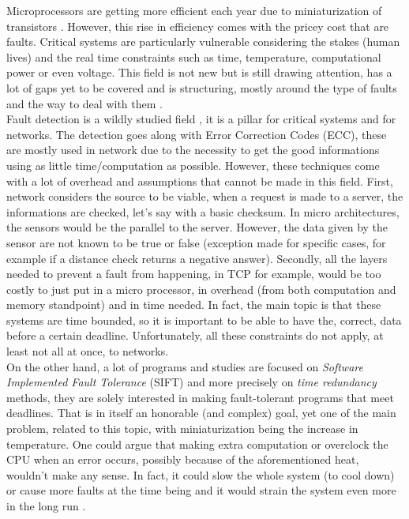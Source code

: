 \documentclass[11pt,a4paper]{report}
\begin{document}
Microprocessors are getting more efficient each year due to miniaturization of transistors \cite{silicon}. 
However, this rise in efficiency comes with the pricey cost that are faults. 
Critical systems are particularly vulnerable considering the stakes (human lives) and the real time constraints such as time, temperature, computational power or even voltage. 
This field is not new \cite{vonneumann56, n-version85} but is still drawing attention, has a lot of gaps yet to be covered and is structuring, mostly around the type of faults and the way to deal with them \cite{future-research}.
\\

Fault detection is a wildly studied field \cite{fault-detection-survey}, it is a pillar for critical systems and for networks. 
The detection goes along with Error Correction Codes (ECC), these are mostly used in network due to the necessity to get the good informations using as little  time/computation as possible. 
However, these techniques come with a lot of overhead and assumptions that cannot be made in this field. 
First, network considers the source to be viable, when a request is made to a server, the informations are checked, let's say with a basic checksum. 
In micro architectures, the sensors would be the parallel to the server. 
However, the data given by the sensor are not known to be true or false (exception made for specific cases, for example if a distance check returns a negative answer). 
Secondly, all the layers needed to prevent a fault from happening, in TCP for example, would be too costly to just put in a micro processor, in overhead (from both computation and memory standpoint) and in time needed. 
In fact, the main topic is that these systems are time bounded, so it is important to be able to have the, correct, data before a certain deadline. 
Unfortunately, all these constraints do not apply, at least not all at once, to networks.
\\


On the other hand, a lot of programs and studies are focused on \textit{Software Implemented Fault Tolerance} (SIFT) and more precisely on \textit{time redundancy} methods, they are solely interested in making fault-tolerant programs that meet deadlines. 
That is in itself an honorable (and complex) goal, yet one of the main problem, related to this topic, with miniaturization being the increase in temperature. 
One could argue that making extra computation or overclock the CPU when an error occurs, possibly because of the aforementioned heat, wouldn't make any sense. 
In fact, it could slow the whole system (to cool down) or cause more faults at the time being and it would strain the system even more in the long run \cite{other-goal,bachelor-thesis}.
\\
\end{document}
